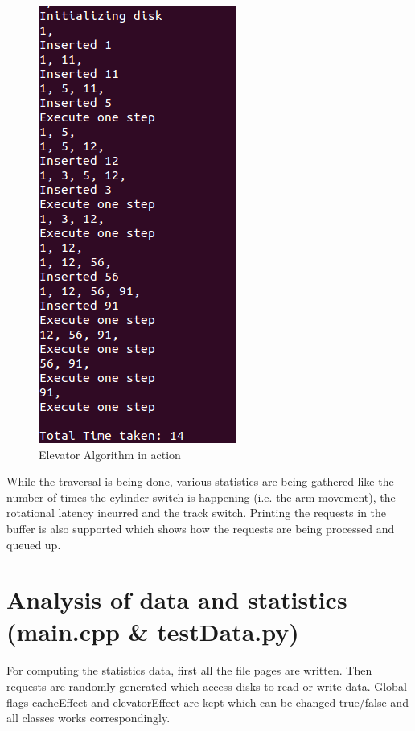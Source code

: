 \documentclass[11pt]{article}
\begin{document}
\begin{figure}[ht!]
\center
\includegraphics[scale = 0.7]{images/elevatorDemo.png}
\caption{Elevator Algorithm in action}
\label{overflow}
\end{figure}

While the traversal is being done, various statistics are being gathered like the number of times the cylinder switch is happening (i.e. the arm movement), the rotational latency incurred and the track switch. Printing the requests in the buffer is also supported which shows how the requests are being processed and queued up.

\section{Analysis of data and statistics \\ (main.cpp \& testData.py)}
\paragraph{}
For computing the statistics data, first all the file pages are written. Then requests are randomly generated which access disks to read or write data. Global flags cacheEffect and elevatorEffect are kept which can be changed true/false and all classes works correspondingly.
\end{document}
